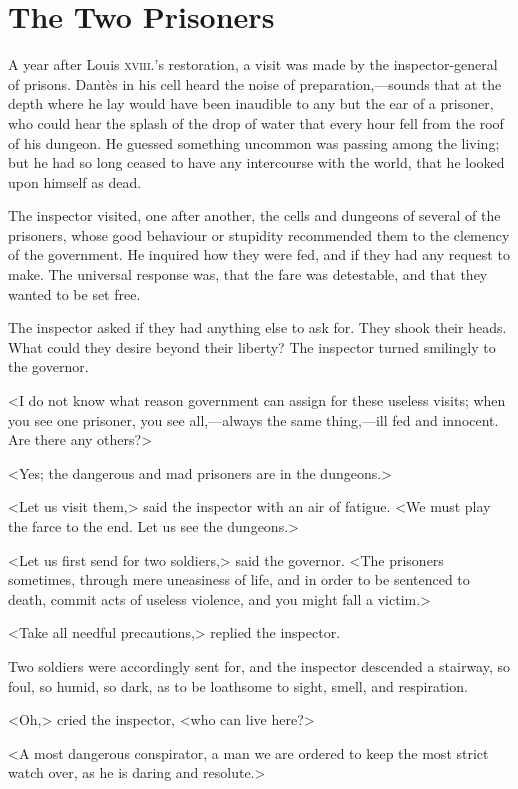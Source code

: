 \chapter{The Two Prisoners} 
	
	\lettrine{A}{} year after Louis \textsc{xviii.}'s restoration, a visit was made by the inspector-general of prisons. Dantès in his cell heard the noise of preparation,—sounds that at the depth where he lay would have been inaudible to any but the ear of a prisoner, who could hear the splash of the drop of water that every hour fell from the roof of his dungeon. He guessed something uncommon was passing among the living; but he had so long ceased to have any intercourse with the world, that he looked upon himself as dead. 

 The inspector visited, one after another, the cells and dungeons of several of the prisoners, whose good behaviour or stupidity recommended them to the clemency of the government. He inquired how they were fed, and if they had any request to make. The universal response was, that the fare was detestable, and that they wanted to be set free. 

 The inspector asked if they had anything else to ask for. They shook their heads. What could they desire beyond their liberty? The inspector turned smilingly to the governor. 

 <I do not know what reason government can assign for these useless visits; when you see one prisoner, you see all,—always the same thing,—ill fed and innocent. Are there any others?> 

 <Yes; the dangerous and mad prisoners are in the dungeons.> 

 <Let us visit them,> said the inspector with an air of fatigue. <We must play the farce to the end. Let us see the dungeons.> 

 <Let us first send for two soldiers,> said the governor. <The prisoners sometimes, through mere uneasiness of life, and in order to be sentenced to death, commit acts of useless violence, and you might fall a victim.> 

 <Take all needful precautions,> replied the inspector. 

 Two soldiers were accordingly sent for, and the inspector descended a stairway, so foul, so humid, so dark, as to be loathsome to sight, smell, and respiration. 

 <Oh,> cried the inspector, <who can live here?> 

 <A most dangerous conspirator, a man we are ordered to keep the most strict watch over, as he is daring and resolute.> 

